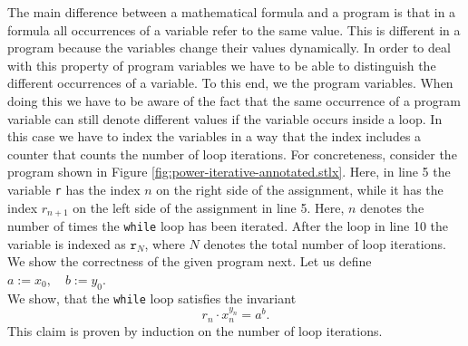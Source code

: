 The main difference between a mathematical formula and a program is that in a formula all
occurrences of a variable refer to the same value.   This is different in a program because the
variables change their values dynamically.  In order to deal with this property of program variables
we have to be able to distinguish the different occurrences of a variable.  To this end,  we 
 the program variables. 
When doing this we have to be aware of the fact that the same occurrence of a program variable can
still denote different values if the variable occurs inside  a loop.  In this case we have to index
the variables in a way that the index includes a counter that counts the number of loop iterations.
For concreteness, consider the  program shown in 
Figure \ref{fig:power-iterative-annotated.stlx}.  
Here, in line 5 the variable \texttt{r} has the index $n$ on the right side of the assignment,
while it has the index $r_{n+1}$ on the left side of the assignment in line 5.  Here, $n$ denotes 
the number of times the \texttt{while} loop has been iterated.
After the loop in line 10 the variable is indexed as
$\texttt{r}_N$, where $N$ denotes the total number of loop iterations.
We show the correctness of the given program next.  Let us define
\\[0.2cm]
\hspace*{1.3cm}
$ a := x_0, \quad b := y_0$.
\\[0.2cm]
We show, that the \texttt{while} loop satisfies the invariant
\begin{equation}
  \label{eq:powerInv}
   r_n \cdot x_n^{y_n} = a^b.
\end{equation}
This claim is proven by induction on the number of loop iterations.
